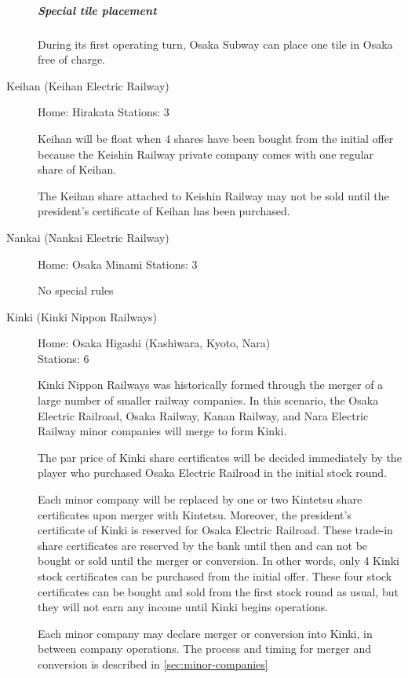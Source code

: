 \begin{multicols}{2}
\begin{description}
\subparagraph{Special tile placement}
During its first operating turn, Osaka Subway can place one tile in
Osaka free of charge.

\item[Keihan (Keihan Electric Railway)] \hfill

Home: Hirakata \hfill Stations: 3

Keihan will be float when 4 shares have been bought from the
initial offer because the Keishin Railway private company comes with
one regular share of Keihan.

The Keihan share attached to Keishin Railway may not be sold until the
president's certificate of Keihan has been purchased.

\item[Nankai (Nankai Electric Railway)] \hfill

Home: Osaka Minami \hfill Stations: 3

No special rules

\item[Kinki (Kinki Nippon Railways)] \hfill
\label{kinki}

Home: Osaka Higashi (Kashiwara, Kyoto, Nara) \\
Stations: 6

Kinki Nippon Railways was historically formed through the merger of a
large number of smaller railway companies. In this scenario, the Osaka
Electric Railroad, Osaka Railway, Kanan Railway, and Nara Electric
Railway minor companies will merge to form Kinki.

The par price of Kinki share certificates will be decided immediately
by the player who purchased Osaka Electric Railroad in the initial
stock round.

Each minor company will be replaced by one or two Kintetsu share
certificates upon merger with Kintetsu. Moreover, the president's
certificate of Kinki is reserved for Osaka Electric Railroad. These
trade-in share certificates are reserved by the bank until then and can not
be bought or sold until the merger or conversion. In other words, only
4 Kinki stock certificates can be purchased from the initial
offer. These four stock certificates can be bought and sold from the
first stock round as usual, but they will not earn any income until
Kinki begins operations.

Each minor company may declare merger or conversion into Kinki, in
between company operations. The process and timing for merger and
conversion is described in \autoref{sec:minor-companies}


\end{description}
\end{multicols}
